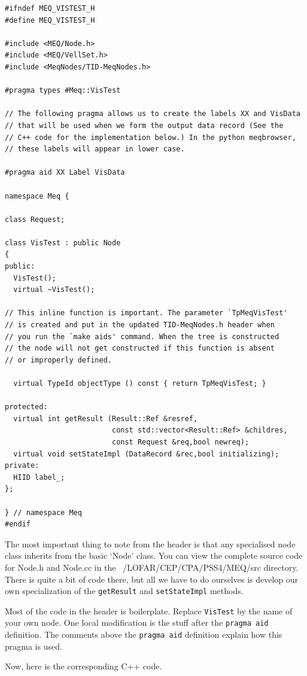 \documentclass[10pt]{article}
\begin{document}
\begin{verbatim}
#ifndef MEQ_VISTEST_H
#define MEQ_VISTEST_H
    
#include <MEQ/Node.h>
#include <MEQ/VellSet.h>
#include <MeqNodes/TID-MeqNodes.h>

#pragma types #Meq::VisTest

// The following pragma allows us to create the labels XX and VisData
// that will be used when we form the output data record (See the
// C++ code for the implementation below.) In the python meqbrowser, 
// these labels will appear in lower case.

#pragma aid XX Label VisData

namespace Meq {

class Request;

class VisTest : public Node
{
public:
  VisTest();
  virtual ~VisTest();

// This inline function is important. The parameter `TpMeqVisTest'
// is created and put in the updated TID-MeqNodes.h header when
// you run the `make aids' command. When the tree is constructed
// the node will not get constructed if this function is absent
// or improperly defined.

  virtual TypeId objectType () const { return TpMeqVisTest; }

protected:
  virtual int getResult (Result::Ref &resref, 
                         const std::vector<Result::Ref> &childres,
                         const Request &req,bool newreq);
  virtual void setStateImpl (DataRecord &rec,bool initializing);
private:
  HIID label_;
};

} // namespace Meq
#endif
\end{verbatim}

The most important thing to note from the header is that any
specialised node class inherits from the basic `Node' class.
You can view the complete source code for Node.h and Node.cc
in the ~/LOFAR/CEP/CPA/PSS4/MEQ/src directory. There is quite a
bit of code there, but all we have to do ourselves is develop
our own specialization of the {\tt getResult} and 
{\tt setStateImpl} methods. 

Most of the code in the header is boilerplate. Replace {\tt VisTest}
by the name of your own node. One local modification is the
stuff after the {\tt pragma aid} definition. The comments
above the {\tt pragma aid} definition explain how this pragma is
used.

Now, here is the corresponding C++ code.
\end{document}

